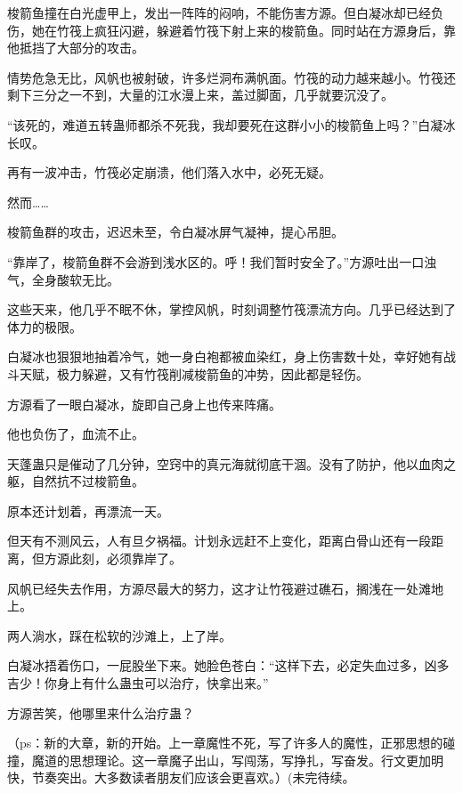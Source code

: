 \begin{this_body}
梭箭鱼撞在白光虚甲上，发出一阵阵的闷响，不能伤害方源。但白凝冰却已经负伤，她在竹筏上疯狂闪避，躲避着竹筏下射上来的梭箭鱼。同时站在方源身后，靠他抵挡了大部分的攻击。

情势危急无比，风帆也被射破，许多烂洞布满帆面。竹筏的动力越来越小。竹筏还剩下三分之一不到，大量的江水漫上来，盖过脚面，几乎就要沉没了。

“该死的，难道五转蛊师都杀不死我，我却要死在这群小小的梭箭鱼上吗？”白凝冰长叹。

再有一波冲击，竹筏必定崩溃，他们落入水中，必死无疑。

然而……

梭箭鱼群的攻击，迟迟未至，令白凝冰屏气凝神，提心吊胆。

“靠岸了，梭箭鱼群不会游到浅水区的。呼！我们暂时安全了。”方源吐出一口浊气，全身酸软无比。

这些天来，他几乎不眠不休，掌控风帆，时刻调整竹筏漂流方向。几乎已经达到了体力的极限。

白凝冰也狠狠地抽着冷气，她一身白袍都被血染红，身上伤害数十处，幸好她有战斗天赋，极力躲避，又有竹筏削减梭箭鱼的冲势，因此都是轻伤。

方源看了一眼白凝冰，旋即自己身上也传来阵痛。

他也负伤了，血流不止。

天蓬蛊只是催动了几分钟，空窍中的真元海就彻底干涸。没有了防护，他以血肉之躯，自然抗不过梭箭鱼。

原本还计划着，再漂流一天。

但天有不测风云，人有旦夕祸福。计划永远赶不上变化，距离白骨山还有一段距离，但方源此刻，必须靠岸了。

风帆已经失去作用，方源尽最大的努力，这才让竹筏避过礁石，搁浅在一处滩地上。

两人淌水，踩在松软的沙滩上，上了岸。

白凝冰捂着伤口，一屁股坐下来。她脸色苍白：“这样下去，必定失血过多，凶多吉少！你身上有什么蛊虫可以治疗，快拿出来。”

方源苦笑，他哪里来什么治疗蛊？

（ps：新的大章，新的开始。上一章魔性不死，写了许多人的魔性，正邪思想的碰撞，魔道的思想理论。这一章魔子出山，写闯荡，写挣扎，写奋发。行文更加明快，节奏突出。大多数读者朋友们应该会更喜欢。）(未完待续。

\end{this_body}


